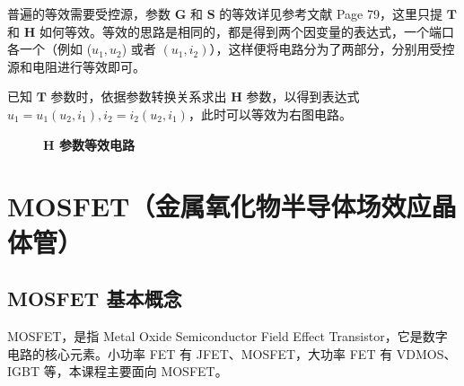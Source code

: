 \documentclass[UTF8]{report}
\theoremstyle{MyLineTheoremStyle} %
\theoremstyle{MyBlockTheoremStyle} %
\theoremstyle{MySubsubsectionStyle} %
\begin{document}
\begin{center}\noindent\begin{minipage}{0.58\columnwidth}
    \hspace*{2em} 普遍的等效需要受控源，参数 $\boldsymbol{G}$ 和 $\boldsymbol{S}$ 的等效详见参考文献 \cite{电路原理} Page 79，这里只提 $\boldsymbol{T}$ 和 $\boldsymbol{H}$ 如何等效。等效的思路是相同的，都是得到两个因变量的表达式，一个端口各一个（例如 ($u_1, u_2$) 或者 $(u_1, i_2)$），这样便将电路分为了两部分，分别用受控源和电阻进行等效即可。

    \hspace*{2em} 已知 $\boldsymbol{T}$ 参数时，依据参数转换关系求出 $\boldsymbol{H}$ 参数，以得到表达式 $u_1 = u_1(u_2,i_1), i_2 = i_2(u_2,i_1)$，此时可以等效为右图电路。
\end{minipage}\hfill\begin{minipage}{0.39\columnwidth}
    \begin{figure}[H]\centering
        
        \caption{\textbf{$\boldsymbol{H}$ 参数等效电路}}\label{H参数等效电路}
    \end{figure}
\end{minipage}\end{center}



\section{MOSFET（金属氧化物半导体场效应晶体管）}

\subsection{MOSFET 基本概念}

MOSFET，是指 Metal Oxide Semiconductor Field Effect Transistor，它是数字电路的核心元素。小功率 FET 有 JFET、MOSFET，大功率 FET 有 VDMOS、IGBT 等，本课程主要面向 MOSFET。
\end{document}
